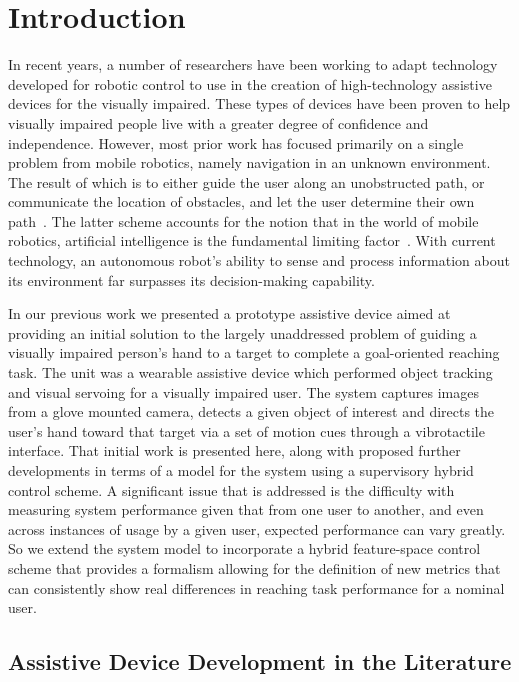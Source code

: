 \chapter{Introduction}\label{ch:Introduction}

In recent years, a number of researchers have been working to adapt
technology developed for robotic control to use in the
creation of high-technology assistive devices for the visually
impaired.  These types of devices have been proven to help visually
impaired people live with a greater degree of confidence and
independence.  However, most prior work has focused primarily on a single
problem from mobile robotics, namely navigation in an
unknown environment.  The result of which is to either guide the user along an unobstructed path, or communicate the location of obstacles, and let the user determine their own path~\cite{Bib:Ram, Bib:Meers}. The latter scheme accounts for the notion that in the world of mobile robotics, artificial intelligence is the fundamental limiting factor~\cite{Bib:Parker}.  With current technology, an autonomous robot's ability to sense and process information about its environment far surpasses its decision-making capability.

In our previous work \cite{JACQUES05, JACQUES07} we presented a prototype assistive device aimed at providing an initial solution to the largely unaddressed problem of guiding a visually impaired person's hand to a target to complete a goal-oriented reaching task.
The unit was a wearable assistive device which performed object tracking and visual servoing for a visually impaired user.  The system captures images from a glove mounted camera, detects a given object of interest and directs the user's hand toward that target via a set of motion cues through a vibrotactile interface.  That initial work is presented here, along with proposed further developments in terms of a model for the system using a supervisory hybrid control scheme.  A significant issue that is addressed is the difficulty with measuring system performance given that from one user to another, and even across instances of usage by a given user, expected performance can vary greatly.  So we extend the system model to incorporate a hybrid feature-space control scheme that provides a formalism allowing for the definition of new metrics that can consistently show real differences in reaching task performance for a nominal user.

\section{Assistive Device Development in the Literature}\label{ch:Introduction:sec:AssDevLit}

